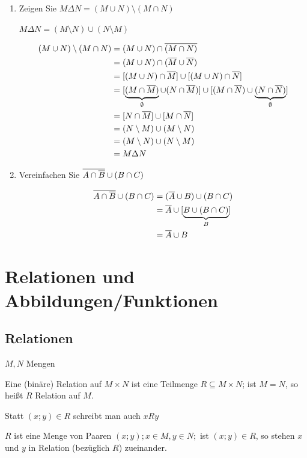 	\Bsps
	\begin{enumerate}
		\item Zeigen Sie $M \Delta N = (M\cup N)\setminus(M\cap N)$

		$M\Delta N = (M\setminus N) \cup (N \setminus M)$
		
		\vspace{-0.6cm}
		\begin{align*}
			(M \cup N)\setminus(M\cap N)&= (M\cup N)\cap\overline{(M\cap N)}\\
			&= (M\cup N)\cap(\overline{M} \cup \overline{N})\\
			&= [(M\cup N) \cap \overline{M}]\cup[(M\cup N)\cap \overline{N}]\\
			&= [\underbrace{(M \cap \overline{M})}_\emptyset \cup (N\cap \overline{M})]\cup[(M\cap \overline{N})\cup \underbrace{(N \cap \overline{N})}_\emptyset]\\
			&= [N\cap \overline{M}] \cup [M \cap \overline{N}]\\
			&= (N\setminus M)\cup(M\setminus N)\\
			&= (M\setminus N) \cup (N\setminus M)\\
			&= M\Delta N
		\end{align*}

		\item Vereinfachen Sie $\overline{A\cap \overline{B}}\cup(B\cap C)$
		
		\begin{align*}
			\overline{A\cap \overline{B}}\cup(B\cap C) &= (\overline{A} \cup B) \cup (B\cap C)\\
			&= \overline{A} \cup [\underbrace{B \cup (B\cap C)}_B]\\
			&= \overline{A} \cup B
		\end{align*}
	\end{enumerate}

\clearpage
\section{Relationen und Abbildungen/Funktionen}

\subsection{Relationen}

\Def $M,N$ Mengen

Eine (binäre) Relation auf $M\times N$ ist eine Teilmenge $R\subseteq M\times N$; ist $M =N$, so heißt $R$ Relation auf $M$.

Statt $(x;y) \in R$ schreibt man auch $xRy$

$R$ ist eine Menge von Paaren $(x;y); x \in M, y \in N;$ ist $(x;y) \in R$, so stehen $x$ und $y$ in Relation (bezüglich $R$) zueinander.

